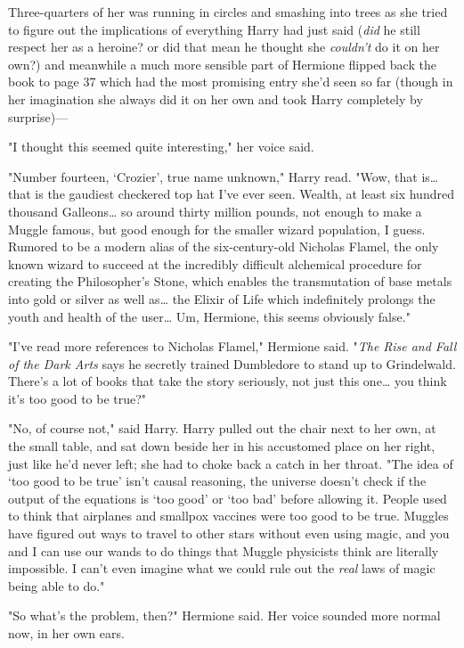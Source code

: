 Three-quarters of her was running in circles and smashing into trees as she
tried to figure out the implications of everything Harry had just said
(\emph{did} he still respect her as a heroine? or did that mean he thought she
\emph{couldn't} do it on her own?) and meanwhile a much more sensible part of
Hermione flipped back the book to page 37 which had the most promising entry
she'd seen so far (though in her imagination she always did it on her own and
took Harry completely by surprise)---

"I thought this seemed quite interesting," her voice said.

"Number fourteen, `Crozier', true name unknown," Harry read. "Wow, that
is{\ldots} that is the gaudiest checkered top hat I've ever seen. Wealth, at
least six hundred thousand Galleons{\ldots} so around thirty million pounds,
not enough to make a Muggle famous, but good enough for the smaller wizard
population, I guess. Rumored to be a modern alias of the six-century-old
Nicholas Flamel, the only known wizard to succeed at the incredibly difficult
alchemical procedure for creating the Philosopher's Stone, which enables the
transmutation of base metals into gold or silver as well as{\ldots} the Elixir
of Life which indefinitely prolongs the youth and health of the user{\ldots}
Um, Hermione, this seems obviously false."

"I've read more references to Nicholas Flamel," Hermione said. "\emph{The Rise
and Fall of the Dark Arts} says he secretly trained Dumbledore to stand up to
Grindelwald. There's a lot of books that take the story seriously, not just
this one{\ldots} you think it's too good to be true?"

"No, of course not," said Harry. Harry pulled out the chair next to her own, at
the small table, and sat down beside her in his accustomed place on her right,
just like he'd never left; she had to choke back a catch in her throat. "The
idea of `too good to be true' isn't causal reasoning, the universe doesn't
check if the output of the equations is `too good' or `too bad' before allowing
it. People used to think that airplanes and smallpox vaccines were too good to
be true. Muggles have figured out ways to travel to other stars without even
using magic, and you and I can use our wands to do things that Muggle
physicists think are literally impossible. I can't even imagine what we could
rule out the \emph{real} laws of magic being able to do."

"So what's the problem, then?" Hermione said. Her voice sounded more normal
now, in her own ears.

